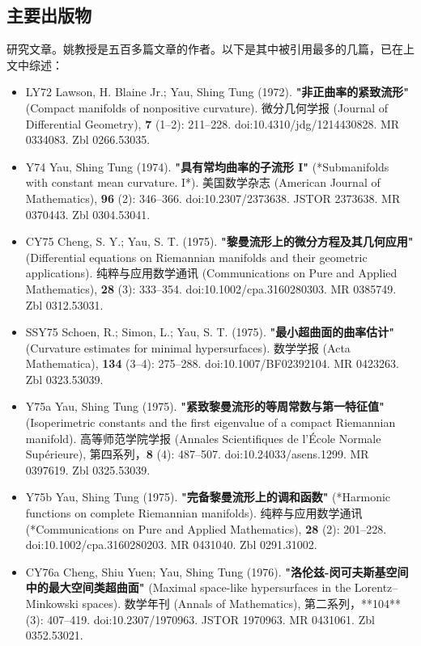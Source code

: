 \subsection{主要出版物}  
研究文章。姚教授是五百多篇文章的作者。以下是其中被引用最多的几篇，已在上文中综述：
\begin{itemize}
\item LY72 Lawson, H. Blaine Jr.; Yau, Shing Tung (1972). \textbf{"非正曲率的紧致流形"} (Compact manifolds of nonpositive curvature). 微分几何学报 (Journal of Differential Geometry), \textbf{7} (1–2): 211–228. doi:10.4310/jdg/1214430828. MR 0334083. Zbl 0266.53035.
\item Y74  Yau, Shing Tung (1974). \textbf{"具有常均曲率的子流形 I"} (*Submanifolds with constant mean curvature. I*). 美国数学杂志 (American Journal of Mathematics), \textbf{96} (2): 346–366. doi:10.2307/2373638. JSTOR 2373638. MR 0370443. Zbl 0304.53041.
\item CY75 Cheng, S. Y.; Yau, S. T. (1975). \textbf{"黎曼流形上的微分方程及其几何应用"} (Differential equations on Riemannian manifolds and their geometric applications). 纯粹与应用数学通讯 (Communications on Pure and Applied Mathematics), \textbf{28} (3): 333–354. doi:10.1002/cpa.3160280303. MR 0385749. Zbl 0312.53031.
\item SSY75 Schoen, R.; Simon, L.; Yau, S. T. (1975). \textbf{"最小超曲面的曲率估计"} (Curvature estimates for minimal hypersurfaces). 数学学报 (Acta Mathematica), \textbf{134} (3–4): 275–288. doi:10.1007/BF02392104. MR 0423263. Zbl 0323.53039.
\item Y75a  Yau, Shing Tung (1975). \textbf{"紧致黎曼流形的等周常数与第一特征值"} (Isoperimetric constants and the first eigenvalue of a compact Riemannian manifold). 高等师范学院学报 (Annales Scientifiques de l'École Normale Supérieure), 第四系列，\textbf{8} (4): 487–507. doi:10.24033/asens.1299. MR 0397619. Zbl 0325.53039.
\item Y75b Yau, Shing Tung (1975). \textbf{"完备黎曼流形上的调和函数"} (*Harmonic functions on complete Riemannian manifolds). 纯粹与应用数学通讯 (*Communications on Pure and Applied Mathematics), \textbf{28} (2): 201–228. doi:10.1002/cpa.3160280203. MR 0431040. Zbl 0291.31002.
\item CY76a  Cheng, Shiu Yuen; Yau, Shing Tung (1976). \textbf{"洛伦兹-闵可夫斯基空间中的最大空间类超曲面"} (Maximal space-like hypersurfaces in the Lorentz–Minkowski spaces). 数学年刊 (Annals of Mathematics), 第二系列，**104** (3): 407–419. doi:10.2307/1970963. JSTOR 1970963. MR 0431061. Zbl 0352.53021.

\end{itemize}
